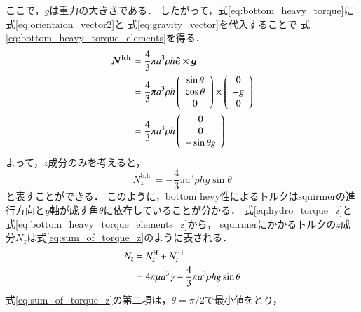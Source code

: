 ここで，$g$は重力の大きさである．
したがって，式\eqref{eq:bottom_heavy_torque}に
式\eqref{eq:orientaion_vector2}と
式\eqref{eq:gravity_vector}を代入することで
式\eqref{eq:bottom_heavy_torque_elements}を得る．
    \begin{align}
        \boldsymbol{N}^\mathrm{b.h.} 
        &= \frac{4}{3} \pi a^3 \rho h \boldsymbol{\hat{e}} \times \boldsymbol{g} \notag \\
        &= \frac{4}{3} \pi a^3 \rho h
        \left(
            \begin{array}{c}
                \sin{\theta} \\
                \cos{\theta} \\
                0
            \end{array}
        \right)
        \times
        \left(
            \begin{array}{c}
                0 \\
                -g \\
                0
            \end{array}
        \right) \notag \\
        &= \frac{4}{3} \pi a^3 \rho h
        \left(
            \begin{array}{c}
                0 \\
                0 \\
                - \sin{\theta} g
            \end{array}
        \right)
        \label{eq:bottom_heavy_torque_elements}
    \end{align}
よって，$z$成分のみを考えると，
    \begin{equation}
        N^\mathrm{b.h.}_z = - \frac{4}{3} \pi a^3 \rho h g \sin{\theta}
        \label{eq:bottom_heavy_torque_elements_z}
    \end{equation}
と表すことができる．
このように，bottom hevy性によるトルクはsquirmerの進行方向と$y$軸が成す角$\theta$に依存していることが分かる．
式\eqref{eq:hydro_torque_z}と式\eqref{eq:bottom_heavy_torque_elements_z}から，
squirmerにかかるトルクの$z$成分$N_z$は式\eqref{eq:sum_of_torque_z}のように表される．
    \begin{align}
        N_z
        &= N^\mathrm{H}_z + N^\mathrm{b.h.}_z \notag \\
        &= 4 \pi \mu a^3 \dot{\gamma} - \frac{4}{3} \pi a^3 \rho h g \sin{\theta}
        \label{eq:sum_of_torque_z}
    \end{align}
式\eqref{eq:sum_of_torque_z}の第二項は，$\theta = \pi / 2$で最小値をとり，
